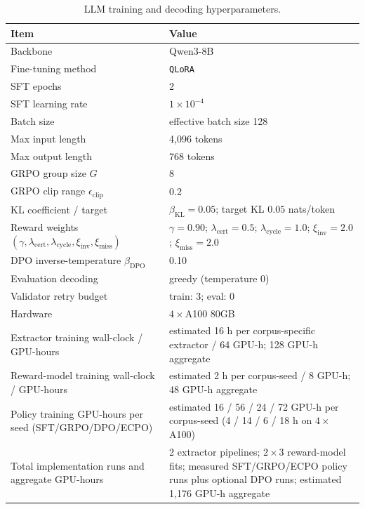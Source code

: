 \documentclass{article}
\begin{document}
\begin{table}[t]
\centering
\caption{LLM training and decoding hyperparameters.}
\label{tab:llm_training_hparams}
\small
\begin{tabularx}{\linewidth}{lY}
\hline
Item & Value \\
\hline
Backbone & Qwen3-8B \\
Fine-tuning method & \texttt{QLoRA} \\
SFT epochs & 2 \\
SFT learning rate & $1\times10^{-4}$ \\
Batch size & effective batch size 128 \\
Max input length & 4{,}096 tokens \\
Max output length & 768 tokens \\
GRPO group size $G$ & 8 \\
GRPO clip range $\epsilon_{\mathrm{clip}}$ & 0.2 \\
KL coefficient / target & $\beta_{\mathrm{KL}}=0.05$; target KL $0.05$ nats/token \\
Reward weights $(\gamma,\lambda_{\mathrm{cert}},\lambda_{\mathrm{cycle}},\xi_{\mathrm{inv}},\xi_{\mathrm{miss}})$ & $\gamma=0.90$; $\lambda_{\mathrm{cert}}=0.5$; $\lambda_{\mathrm{cycle}}=1.0$; $\xi_{\mathrm{inv}}=2.0$; $\xi_{\mathrm{miss}}=2.0$ \\
DPO inverse-temperature $\beta_{\mathrm{DPO}}$ & 0.10 \\
Evaluation decoding & greedy (temperature 0) \\
Validator retry budget & train: 3; eval: 0 \\
Hardware & $4\times$A100 80GB \\
Extractor training wall-clock / GPU-hours & estimated 16 h per corpus-specific extractor / 64 GPU-h; 128 GPU-h aggregate \\
Reward-model training wall-clock / GPU-hours & estimated 2 h per corpus-seed / 8 GPU-h; 48 GPU-h aggregate \\
Policy training GPU-hours per seed (SFT/GRPO/DPO/ECPO) & estimated 16 / 56 / 24 / 72 GPU-h per corpus-seed (4 / 14 / 6 / 18 h on $4\times$A100) \\
Total implementation runs and aggregate GPU-hours & 2 extractor pipelines; $2\times3$ reward-model fits; measured SFT/GRPO/ECPO policy runs plus optional DPO runs; estimated 1{,}176 GPU-h aggregate \\
\hline
\end{tabularx}
\end{table}
\end{document}
